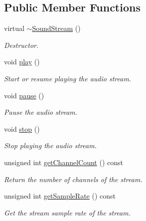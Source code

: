 \subsection*{Public Member Functions}
\begin{DoxyCompactItemize}
\item 
\hypertarget{classsf_1_1_sound_stream_a1fafb9f1ca572d23d7d6a17921860d85}{virtual \hyperlink{classsf_1_1_sound_stream_a1fafb9f1ca572d23d7d6a17921860d85}{$\sim$\+Sound\+Stream} ()}\label{classsf_1_1_sound_stream_a1fafb9f1ca572d23d7d6a17921860d85}

\begin{DoxyCompactList}\small\item\em Destructor. \end{DoxyCompactList}\item 
void \hyperlink{classsf_1_1_sound_stream_afdc08b69cab5f243d9324940a85a1144}{play} ()
\begin{DoxyCompactList}\small\item\em Start or resume playing the audio stream. \end{DoxyCompactList}\item 
void \hyperlink{classsf_1_1_sound_stream_a932ff181e661503cad288b4bb6fe45ca}{pause} ()
\begin{DoxyCompactList}\small\item\em Pause the audio stream. \end{DoxyCompactList}\item 
void \hyperlink{classsf_1_1_sound_stream_a16cc6a0404b32e42c4dce184bb94d0f4}{stop} ()
\begin{DoxyCompactList}\small\item\em Stop playing the audio stream. \end{DoxyCompactList}\item 
unsigned int \hyperlink{classsf_1_1_sound_stream_a68dedd0a2c26e6937c80fab3d235edea}{get\+Channel\+Count} () const 
\begin{DoxyCompactList}\small\item\em Return the number of channels of the stream. \end{DoxyCompactList}\item 
unsigned int \hyperlink{classsf_1_1_sound_stream_aad1da51c7a752682ca208bf11e3349bb}{get\+Sample\+Rate} () const 
\begin{DoxyCompactList}\small\item\em Get the stream sample rate of the stream. \end{DoxyCompactList}\item 

\end{DoxyCompactItemize}
